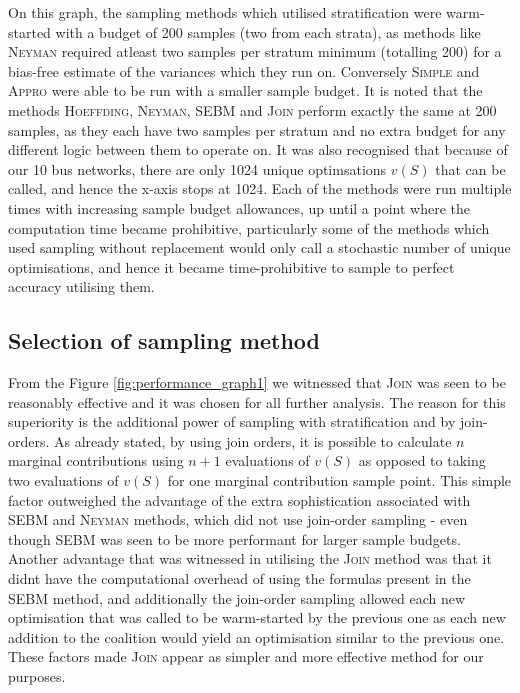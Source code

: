 On this graph, the sampling methods which utilised stratification were warm-started with a budget of 200 samples (two from each strata), as methods like \textsc{Neyman} required atleast two samples per stratum minimum (totalling 200) for a bias-free estimate of the variances which they run on.
Conversely \textsc{Simple} and \textsc{Appro} were able to be run with a smaller sample budget.
It is noted that the methods \textsc{Hoeffding}, \textsc{Neyman}, \textsc{SEBM} and \textsc{Join} perform exactly the same at 200 samples, as they each have two samples per stratum and no extra budget for any different logic between them to operate on.
It was also recognised that because of our 10 bus networks, there are only 1024 unique optimsations $v(S)$ that can be called, and hence the x-axis stops at 1024.
Each of the methods were run multiple times with increasing sample budget allowances, up until a point where the computation time became prohibitive, particularly some of the methods which used sampling without replacement would only call a stochastic number of unique optimisations, and hence it became time-prohibitive to sample to perfect accuracy utilising them.

\subsection{Selection of sampling method}

From the Figure \ref{fig:performance_graph1} we witnessed that \textsc{Join} was seen to be reasonably effective and it was chosen for all further analysis.
The reason for this superiority is the additional power of sampling with stratification and by join-orders.
As already stated, by using join orders, it is possible to calculate $n$ marginal contributions using $n+1$ evaluations of $v(S)$ as opposed to taking two evaluations of $v(S)$ for one marginal contribution sample point.
This simple factor outweighed the advantage of the extra sophistication associated with \textsc{SEBM} and \textsc{Neyman} methods, which did not use join-order sampling - even though SEBM was seen to be more performant for larger sample budgets.
Another advantage that was witnessed in utilising the \textsc{Join} method was that it didnt have the computational overhead of using the formulas present in the \textsc{SEBM} method, and additionally the join-order sampling allowed each new optimisation that was called to be warm-started by the previous one as each new addition to the coalition would yield an optimisation similar to the previous one.
These factors made \textsc{Join} appear as simpler and more effective method for our purposes.

